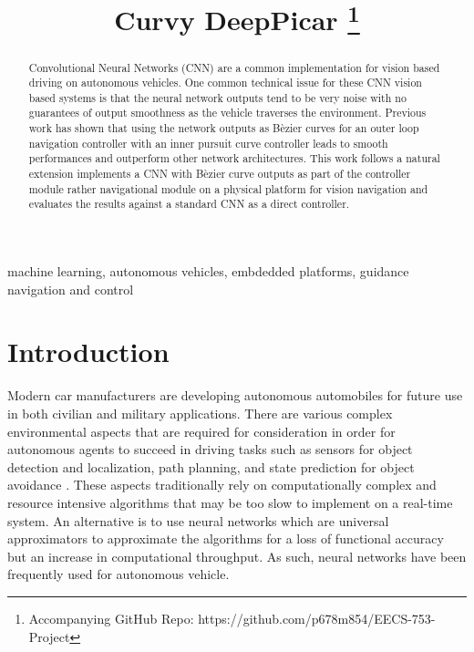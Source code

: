 \documentclass[conference]{IEEEtran}
\begin{document}
\title{Curvy DeepPicar
\thanks{Accompanying GitHub Repo: https://github.com/p678m854/EECS-753-Project}
}

\author{
}

\maketitle

\begin{abstract}

Convolutional Neural Networks (CNN) are a common implementation for vision based driving on autonomous vehicles. One common technical issue for these CNN vision based systems is that the neural network outputs tend to be very noise with no guarantees of output smoothness as the vehicle traverses the environment. Previous work has shown that using the network outputs as B\`ezier curves for an outer loop navigation controller with an inner pursuit curve controller leads to smooth performances and outperform other network architectures. This work follows a natural extension implements a CNN with B\`ezier curve outputs as part of the controller module rather navigational module on a physical platform for vision navigation and evaluates the results against a standard CNN as a direct controller.

\end{abstract}

\begin{IEEEkeywords}
machine learning, autonomous vehicles, embdedded platforms, guidance navigation and control
\end{IEEEkeywords}

\section{Introduction}

Modern car manufacturers are developing autonomous automobiles for future use in both civilian and military applications. There are various complex environmental aspects that are required for consideration in order for autonomous agents to succeed in driving tasks such as sensors for object detection and localization, path planning, and state prediction for object avoidance \cite{kato2018}. These aspects traditionally rely on computationally complex and resource intensive algorithms that may be too slow to implement on a real-time system. An alternative is to use neural networks which are universal approximators \cite{wang2021interval} to approximate the algorithms for a loss of functional accuracy but an increase in computational throughput. As such, neural networks have been frequently used for autonomous vehicle.
\end{document}
